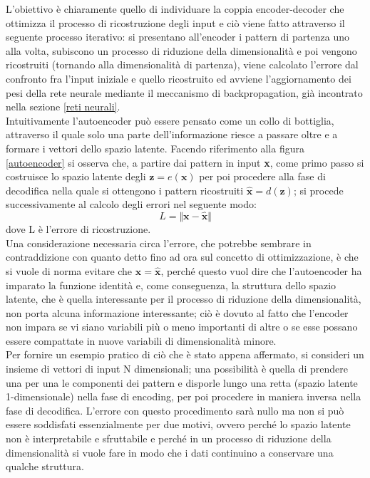 L'obiettivo è chiaramente quello di individuare la coppia encoder-decoder che ottimizza il processo di ricostruzione degli input e ciò viene fatto attraverso il seguente processo iterativo: si presentano all'encoder i pattern di partenza uno alla volta, subiscono un processo di riduzione della dimensionalità e poi vengono ricostruiti (tornando alla dimensionalità di partenza), viene calcolato l'errore dal confronto fra l'input iniziale e quello ricostruito ed avviene l'aggiornamento dei pesi della rete neurale mediante il meccanismo di backpropagation, già incontrato nella sezione \ref{reti neurali}. \\
Intuitivamente l'autoencoder può essere pensato come un collo di bottiglia, attraverso il quale solo una parte dell'informazione riesce a passare oltre e a formare i vettori dello spazio latente.
Facendo riferimento alla figura \ref{autoencoder} si osserva che, a partire dai pattern in input \textbf{x}, come primo passo si costruisce lo spazio latente degli $\textbf{z} = e(\textbf{x})$ per poi procedere alla fase di decodifica nella quale si ottengono i pattern ricostruiti $\hat{\textbf{x}} = d(\textbf{z})$; si procede successivamente al calcolo degli errori nel seguente modo:
\begin{equation}
	L = \Vert \textbf{x} - \hat{\textbf{x}} \Vert
\end{equation}
dove L è l'errore di ricostruzione.\\
Una considerazione necessaria circa l'errore, che potrebbe sembrare in contraddizione con quanto detto fino ad ora sul concetto di ottimizzazione, è che si vuole di norma evitare che $\textbf{x} = \hat{\textbf{x}}$, perché questo vuol dire che l'autoencoder ha imparato la funzione identità e, come conseguenza, la struttura dello spazio latente, che è quella interessante per il processo di riduzione della dimensionalità, non porta alcuna informazione interessante; ciò è dovuto al fatto che l'encoder non impara se vi siano variabili più o meno importanti di altre o se esse possano essere compattate in nuove variabili di dimensionalità minore. \\
Per fornire un esempio pratico di ciò che è stato appena affermato, si consideri un insieme di vettori di input N dimensionali; una possibilità è quella di prendere una per una le componenti dei pattern e disporle lungo una retta (spazio latente 1-dimensionale) nella fase di encoding, per poi procedere in maniera inversa nella fase di decodifica. L'errore con questo procedimento sarà nullo ma non si può essere soddisfati essenzialmente per due motivi, ovvero perché lo spazio latente non è interpretabile e sfruttabile e perché in un processo di riduzione della dimensionalità si vuole fare in modo che i dati continuino a conservare una qualche struttura. \\
